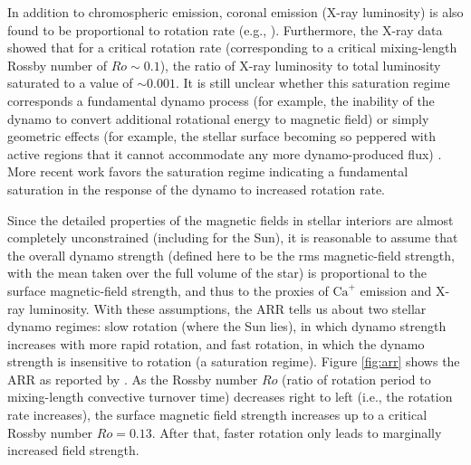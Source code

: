 \documentclass[12pt]{article} %
\begin{document}
In addition to chromospheric emission, coronal emission (X-ray luminosity) is also found to be proportional to rotation rate (e.g., \citealt{Walter1982}). Furthermore, the X-ray data showed that for a critical rotation rate (corresponding to a critical mixing-length Rossby number of $Ro\sim0.1$), the ratio of X-ray luminosity to total luminosity saturated to a value of $\sim0.001$. It is still unclear whether this saturation regime corresponds a fundamental dynamo process (for example, the inability of the dynamo to convert additional rotational energy to magnetic field) or simply geometric effects (for example, the stellar surface becoming so peppered with active regions that it cannot accommodate any more dynamo-produced flux) \citep{Jardine1999}. More recent work \citep{Reiners2022} favors the saturation regime indicating a fundamental saturation in the response of the dynamo to increased rotation rate. 

Since the detailed properties of the magnetic fields in stellar interiors are almost completely unconstrained (including for the Sun), it is reasonable to assume that the overall dynamo strength (defined here to be the rms magnetic-field strength, with the mean taken over the full volume of the star) is proportional to the surface magnetic-field strength, and thus to the proxies of $\text{Ca}^+$ emission and X-ray luminosity. With these assumptions, the ARR tells us about two stellar dynamo regimes: slow rotation (where the Sun lies), in which dynamo strength increases with more rapid rotation, and fast rotation, in which the dynamo strength is insensitive to rotation (a saturation regime). Figure \ref{fig:arr} shows the ARR as reported by \citet{Reiners2022}. As the Rossby number $Ro$ (ratio of rotation period to mixing-length convective turnover time) decreases right to left (i.e., the rotation rate increases), the surface magnetic field strength increases up to a critical Rossby number $Ro=0.13$. After that, faster rotation only leads to marginally increased field strength.
\end{document}
